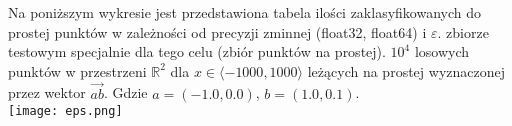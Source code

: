 \quad Na poniższym wykresie jest przedstawiona tabela ilości 
zaklasyfikowanych do prostej punktów w zależności od precyzji zminnej (float32, float64) i 
$\varepsilon$.
zbiorze testowym specjalnie dla tego celu (zbiór punktów na prostej).
$ 10^4$ losowych punktów w przestrzeni $\mathbb{R}^2$ dla $ x \in \langle -1000,1000 \rangle$ leżących na prostej wyznaczonej przez wektor $ \overrightarrow{ab}$.   
    Gdzie $ a = (-1.0, 0.0)$, $ b = (1.0, 0.1)$.
\\
\texttt{[image: eps.png]}